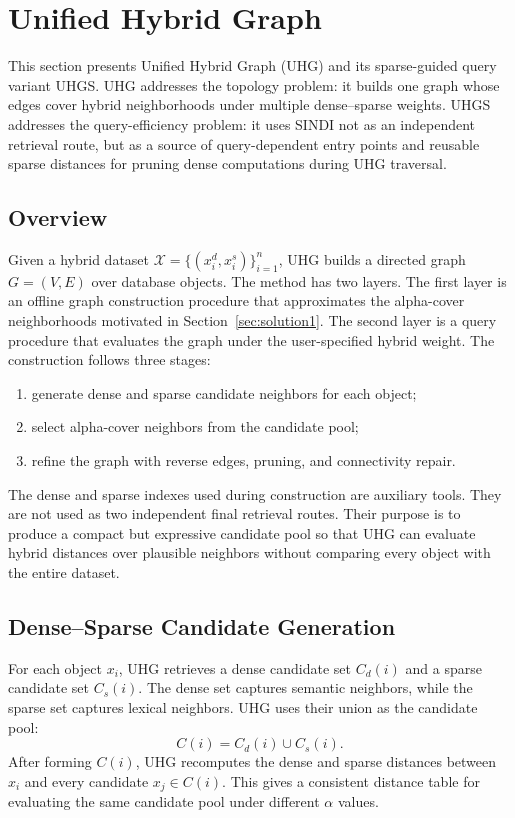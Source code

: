 \section{Unified Hybrid Graph}
\label{sec:solution2}

This section presents Unified Hybrid Graph (UHG) and its sparse-guided query variant UHGS. UHG addresses the topology problem: it builds one graph whose edges cover hybrid neighborhoods under multiple dense--sparse weights. UHGS addresses the query-efficiency problem: it uses SINDI not as an independent retrieval route, but as a source of query-dependent entry points and reusable sparse distances for pruning dense computations during UHG traversal.

\subsection{Overview}

Given a hybrid dataset $\mathcal{X}=\{(x_i^d,x_i^s)\}_{i=1}^{n}$, UHG builds a directed graph $G=(V,E)$ over database objects. The method has two layers. The first layer is an offline graph construction procedure that approximates the alpha-cover neighborhoods motivated in Section~\ref{sec:solution1}. The second layer is a query procedure that evaluates the graph under the user-specified hybrid weight. The construction follows three stages:
\begin{enumerate}
    \item generate dense and sparse candidate neighbors for each object;
    \item select alpha-cover neighbors from the candidate pool;
    \item refine the graph with reverse edges, pruning, and connectivity repair.
\end{enumerate}

The dense and sparse indexes used during construction are auxiliary tools. They are not used as two independent final retrieval routes. Their purpose is to produce a compact but expressive candidate pool so that UHG can evaluate hybrid distances over plausible neighbors without comparing every object with the entire dataset.

\subsection{Dense--Sparse Candidate Generation}

For each object $x_i$, UHG retrieves a dense candidate set $C_d(i)$ and a sparse candidate set $C_s(i)$. The dense set captures semantic neighbors, while the sparse set captures lexical neighbors. UHG uses their union as the candidate pool:
\begin{equation}
    C(i)=C_d(i)\cup C_s(i).
    \label{eq:candidate-union}
\end{equation}
After forming $C(i)$, UHG recomputes the dense and sparse distances between $x_i$ and every candidate $x_j\in C(i)$. This gives a consistent distance table for evaluating the same candidate pool under different $\alpha$ values.

